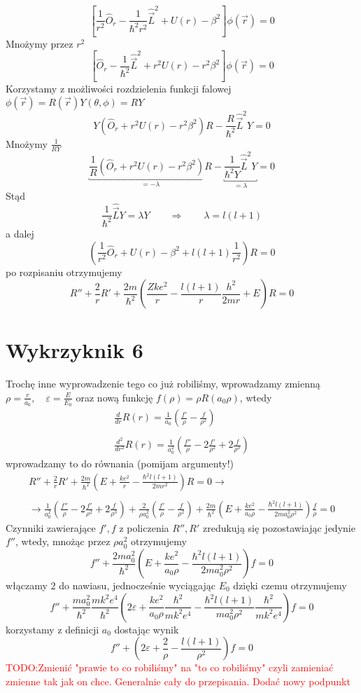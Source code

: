 \documentclass[a4paper,12pt]{article}
\newcommand\myworries[1]{\textcolor{red}{#1}} %
\begin{document}
\[
  \left[ \frac{1}{r^2} \hat{O}_r - \frac{1}{\hbar^2 r^2}\hat{\vec{L}}^2 + U(r) -
\beta^2 \right] \phi (\vec{r}) = 0
\]
Mnożymy przez $r^2$
\[
  \left[ \hat{O}_r - \frac{1}{\hbar^2}\hat{\vec{L}}^2 + r^2U(r) -
r^2 \beta^2 \right] \phi (\vec{r}) = 0
\]
Korzystamy z możliwości rozdzielenia funkcji falowej $\phi (\vec{r}) =
R(\vec{r}) Y(\theta, \phi) = R Y$
\[
  Y\left( \hat{O}_r + r^2U(r) -
  r^2 \beta^2 \right)R - \frac{R}{\hbar^2}\hat{\vec{L}}^2Y = 0
\]
Mnożymy $\frac{1}{RY}$
\[
  \underbracket{\frac{1}{R}\left( \hat{O}_r + r^2U(r) -
    r^2 \beta^2 \right)R}_{=-\lambda} - \underbracket{\frac{1}{\hbar^2
Y}\hat{\vec{L}}^2Y}_{=\lambda} = 0
\]
Stąd 
\[
  \frac{1}{\hbar^2}\hat{\vec{L}} Y = \lambda Y \qquad \Rightarrow \qquad \lambda = l(l+1)
\]
a dalej
\[
  \left(\frac{1}{r^2}\hat{O}_r + U(r) - \beta^2 + l(l+1)\frac{1}{r^2} \right)R = 0
\]
po rozpisaniu otrzymujemy
\[
  R'' + \frac{2}{r}R' + \frac{2m}{\hbar^2}\left(\frac{Zke^2}{r} -
  \frac{l(l+1)}{r} \frac{h^2}{2mr} + E \right) R = 0
\]
\section{Wykrzyknik 6}
Trochę inne wyprowadzenie tego co już robiliśmy, wprowadzamy zmienną $\rho = \frac{r}{a_0},\quad \varepsilon = \frac{E}{E_0}$ oraz nową funkcję
$f(\rho) = \rho R(a_0 \rho)$, wtedy
$$
\begin{array}{l}
	\frac{d}{dr}R(r) = \frac{1}{a_0}\left(\frac{f'}{\rho} - \frac{f}{\rho^2}\right)\\\\
	\frac{d^2}{dr^2}R(r) = \frac{1}{a_0^2}\left(\frac{f''}{\rho}-2\frac{f'}{\rho^2}+2\frac{f}{\rho^3}\right)
\end{array}
$$
wprowadzamy to do równania (pomijam argumenty!)
$$
\begin{array}{l}
	R'' +\frac{2}{r}R' + \frac{2m}{\hbar^2}\left(E+\frac{ke^2}{r}-\frac{\hbar^2l(l+1)}{2mr^2}\right)R = 0 \to \\\\
	\to \frac{1}{a_0^2}\left(\frac{f''}{\rho}-2\frac{f'}{\rho^2}+2\frac{f}{\rho^3}\right) + \frac{2}{\rho a_0^2}\left(\frac{f'}{\rho} - \frac{f}{\rho^2}\right)
	+\frac{2m}{\hbar^2}\left(E+\frac{ke^2}{a_0\rho}-\frac{\hbar^2l(l+1)}{2ma_0^2\rho^2}\right)\frac{f}{\rho} = 0
\end{array}
$$
Czynniki zawierające $f', f$ z policzenia $R'',R'$ zredukują się pozostawiając jedynie $f''$, wtedy, mnożąc przez $\rho a_0^2$ otrzymujemy
$$
	f''  +\frac{2ma_0^2}{\hbar^2}\left(E+\frac{ke^2}{a_0\rho}-\frac{\hbar^2l(l+1)}{2ma_0^2\rho^2}\right)f = 0
$$
włączamy $2$ do nawiasu, jednocześnie wyciągając $E_0$ dzięki czemu otrzymujemy
$$
	f''  +\frac{ma_0^2}{\hbar^2}\frac{mk^2e^4}{\hbar^2}\left(2\varepsilon+\frac{ke^2}{a_0\rho}\frac{\hbar^2}{mk^2e^4}-\frac{\hbar^2l(l+1)}{ma_0^2\rho^2}\frac{\hbar^2}{mk^2e^4}\right)f = 0
$$
korzystamy z definicji $a_0$ dostając wynik 
$$
	f'' + \left(2\varepsilon+\frac{2}{\rho}- \frac{l(l+1)}{\rho^2}\right)f = 0
$$
\myworries{TODO:Zmienić "prawie to co robiliśmy" na "to co robiliśmy" czyli zamieniać zmienne tak jak on chce. Generalnie cały do przepisania. Dodać nowy podpunkt}
\end{document}
